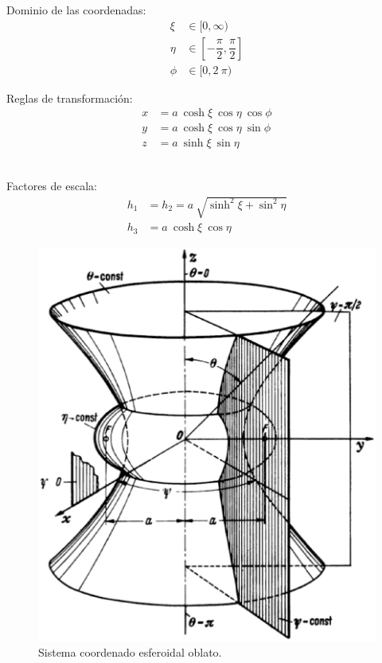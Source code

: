 \documentclass[12pt]{article}
\numberwithin{equation}{section}
\begin{document}
\begin{minipage}{0.45\textwidth}
Dominio de las coordenadas:
\begin{align*}
\xi &\in [0, \infty) \\
\eta &\in \left[- \dfrac{\pi}{2}, \dfrac{\pi}{2} \right] \\
\phi &\in [0, 2\: \pi)
\end{align*}
\end{minipage}
\hspace{1cm}
\begin{minipage}{0.4\textwidth}
Reglas de transformación:
\begin{align*}
x &= a \: \cosh \xi \: \cos \eta \: \cos \phi \\
y &= a \: \cosh \xi \: \cos \eta \: \sin \phi\\
z &= a \: \sinh \xi \: \sin \eta
\end{align*}
\end{minipage}
\\[0.75em]
Factores de escala:
\begin{align*}
h_{1 }&= h_{2} = a \: \sqrt{\sinh^{2} \xi + \sin^{2} \eta} \\
h_{3 }&= a \: \cosh \xi \: \cos \eta
\end{align*}

\begin{figure}[H]
  \centering
  \includegraphics[scale=0.5]{Imagenes/Sistema_Esfeoridal_Oblato.eps}
  \caption{Sistema coordenado esferoidal oblato.}
\end{figure}
\end{document}
